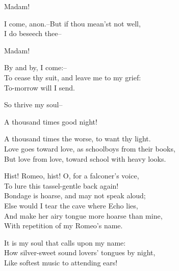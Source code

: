 \begin{speech}
 Madam! \\
\end{speech}
\begin{speech}
I come, anon.--But if thou mean'st not well, \\
I do beseech thee-- \\
\end{speech}
\begin{speech}
 Madam! \\
\end{speech}
\begin{speech}
By and by, I come:-- \\
To cease thy suit, and leave me to my grief: \\
To-morrow will I send. \\
\end{speech}
\begin{speech}
So thrive my soul-- \\
\end{speech}
\begin{speech}
A thousand times good night! 
\\
\end{speech}
\begin{speech}
A thousand times the worse, to want thy light. \\

Love goes toward love, as schoolboys from their books, \\
But love from love, toward school with heavy looks.   \\
\end{speech}
\begin{speech}
Hist! Romeo, hist! O, for a falconer's voice, \\
To lure this tassel-gentle back again! \\
Bondage is hoarse, and may not speak aloud; \\
Else would I tear the cave where Echo lies, \\
And make her airy tongue more hoarse than mine, \\
With repetition of my Romeo's name. \\
\end{speech}
\begin{speech}
It is my soul that calls upon my name: \\
How silver-sweet sound lovers' tongues by night, \\
Like softest music to attending ears! \\
\end{speech}
